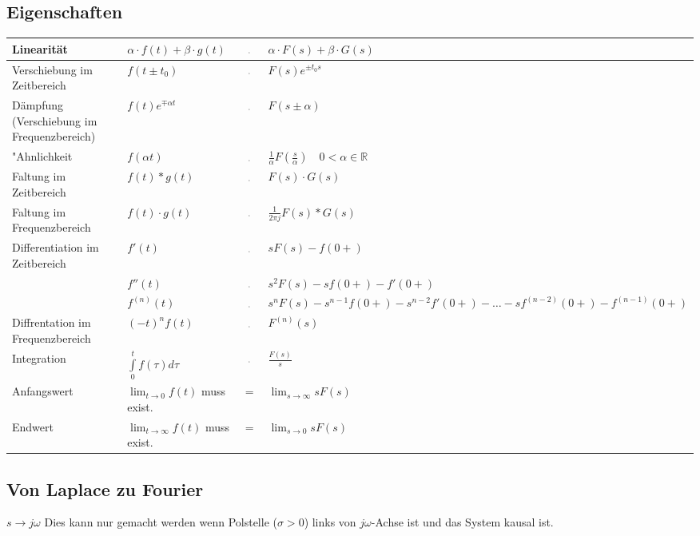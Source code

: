  	\subsection{Eigenschaften}
  		\renewcommand{\arraystretch}{2}
		\begin{tabular}{|l|l c p{5.5cm}|}
        	\hline
        	Linearität & 
 			$\alpha\cdot f(t) + \beta\cdot g(t)$ & $\FT$ & $\alpha\cdot F(s) +
 			\beta\cdot G(s)$ \\
 			\hline
 			Verschiebung im Zeitbereich &
 			$f(t\pm t_0) $ & $\FT$ & $ F(s)e^{\pm t_0 s}$ \\
 			\hline
 			Dämpfung (Verschiebung im Frequenzbereich) &
 			$f(t)e^{\mp\alpha t}$ & $\FT$ & $F(s\pm\alpha)$ \\
 			\hline
 			"Ahnlichkeit&
 			$f(\alpha t)$ & $\FT$ & $\frac{1}{\alpha}F \left (\frac{s}{\alpha} \right )
 			\quad 0 <\alpha \in\mathbb{R}$ \\
 			\hline
 			Faltung im Zeitbereich &
 			$f(t) \ast g(t)$ & $\FT$ &
 			$F(s) \cdot G(s)$\\
 			\hline 			
 			Faltung im Frequenzbereich &
 			$f(t) \cdot g(t)$ & $\FT$ & $\frac{1}{2 \pi j} F(s) \ast G(s)$ \\
 			\hline
 			Differentiation im Zeitbereich &
 			$f'(t)$ & $\FT$ & $sF(s) - f(0+)$ \\ 
 			&
 			$f''(t)$ & $\FT$ & $s^2 F(s) - sf(0+) - f'(0+)$\\ 
 			&
 			$f^{(n)}(t)$ & $\FT$ & $s^nF(s) - s^{n-1}f(0+) - s^{n-2} f'(0+) - \ldots
 			-s f^{(n-2)}(0+) - f^{(n-1)}(0+)$ \\
 			\hline
 			Diffrentation im Frequenzbereich &
 			$(-t)^n f(t)$ & $\FT$ & $F^{(n)}(s)$ \\
 			\hline
 			Integration &
 			$\int\limits_0^t f(\tau)d\tau$ & $\FT$ & $\frac{F(s)}{s}$ \\
 			\hline
 			Anfangswert &
 			$\lim_{t\rightarrow 0} f(t)$ muss exist. & $=$ & $\lim_{s\rightarrow
 			\infty} sF(s)$ \\
 			\hline
 			Endwert &
 			$\lim_{t\rightarrow \infty} f(t)$ muss exist. & $=$ & 
 			$\lim_{s\rightarrow 0} sF(s)$ \\
 			\hline
       	\end{tabular}
		\renewcommand{\arraystretch}{1}
		
		\subsection{Von Laplace zu Fourier}
			$s \rightarrow j\omega$ \hspace{0.5cm}
			Dies kann nur gemacht werden wenn Polstelle ($\sigma > 0$) links von
			$j\omega$-Achse ist und das System kausal ist.
			

